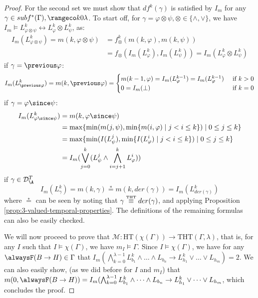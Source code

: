 \begin{proof}
  For the second set we must show that $df^k(\gamma)$ is satisfied by
  $I_m$ for any $\gamma \in subf^*(\Gamma), \kinlambda$. To start off,
  for $\gamma=\varphi \otimes \psi, \otimes \in \{ \land, \lor \}$, we
  have
  $I_m \models L^k_{\varphi \otimes \psi} \leftrightarrow L^k_\varphi
  \otimes L^k_\psi$, as:
  \begin{align*}
  I_m(L^k_{\varphi \otimes \psi}) = m(k,\varphi \otimes \psi) &= f_{\otimes}^k(m(k,\varphi),m(k,\psi))\\
  &= f_{\otimes}(I_m(L^k_\varphi),I_m(L^k_\psi)) = I_m(L^k_{\varphi} \otimes L^k_{\psi})
  \end{align*}
  if $\gamma=\previous \varphi$:
  $$
  I_m(L^k_{\previous \varphi}) = m(k,\previous \varphi) = \begin{cases}
    m(k-1,\varphi)=I_m(L^{k-1}_\varphi)=I_m(L^{k-1}_\varphi) &\text{ if } k > 0\\
    0=I_m(\bot) &\text{ if } k = 0
    \end{cases}
  $$
  if $\gamma=\varphi \since \psi$:
  \begin{align*}
  I_m(L^k_{\varphi \since \psi}) 
    &= m(k,\varphi \since \psi)\\ 
    &= \max \{\min (m(j, \psi), \min \{m(i, \varphi) \mid j<i \leq k\}) \mid 0 \leq j \leq k\}\\
    &= \max \{\min (I(L^j_{\psi}), \min \{I(L^i_{\varphi}) \mid j<i \leq k\}) \mid 0 \leq j \leq k\} \\
    &= I_m(\bigvee_{j=0}^{k}(L_\psi^j \wedge \bigwedge_{i=j+1}^{k}L_{\varphi}^i))
  \end{align*}
  if $\gamma \in \mathcal{D}_{\A}^{T}$
  $$
  I_m(L^k_{\gamma}) = m(k,\gamma) \stackrel{*}{=} m(k,der(\gamma)) = I_m(L^k_{der(\gamma)})
  $$
  where $\stackrel{*}{=}$ can be seen by noting that
  $\gamma \stackrel{\normalfont\mbox{\tiny THT}}{\equiv} der(\gamma)$, and applying Proposition
  \ref{prop:3-valued-temporal-properties}. The definitions of the
  remaining formulas can also be easily checked.

  We will now proceed to prove that
  $\mathcal{M}: \text{HT}(\chi(\Gamma)) \rightarrow
  \text{THT}(\Gamma,\lambda)$, that is, for any $I$ such that
  $I \models \chi(\Gamma)$, we have $m_I \models \Gamma$. Since
  $I \models \chi(\Gamma)$, we have for any
  $\tempruleshort \in \Gamma$ that
  $I_m(\bigwedge_{k=0}^{\lambda-1} L_{b_1}^k \land \dots \land L_{b_n}
  \rightarrow L_{h_1}^k \lor \dots \lor L_{h_m})=2$. We can also
  easily show, (as we did before for $I$ and $m_I$) that
  $m(0,\tempruleshort)=I_m(\bigwedge_{k=0}^{\lambda-1} L_{b_1}^k \land
  \dots \land L_{b_n} \rightarrow L_{h_1}^k \lor \dots \lor L_{h_m}$,
  which concludes the proof.
\end{proof}

